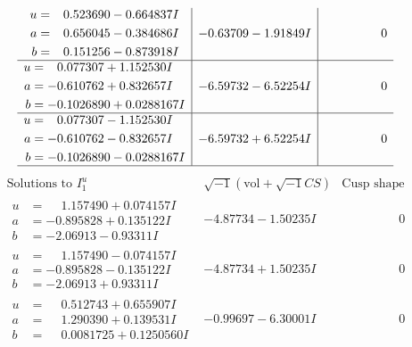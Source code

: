 \documentclass[1p]{elsarticle_modified}
\theoremstyle{definition}
\newcommand{\I}{\sqrt{-1}}
\begin{document}
$$\begin{array}{c|c|c}
\begin{aligned}
u &= \phantom{-}0.523690 - 0.664837 I \\
a &= \phantom{-}0.656045 - 0.384686 I \\
b &= \phantom{-}0.151256 - 0.873918 I\end{aligned}
 & -0.63709 - 1.91849 I & \phantom{-0.000000 } 0 \\ \hline\begin{aligned}
u &= \phantom{-}0.077307 + 1.152530 I \\
a &= -0.610762 + 0.832657 I \\
b &= -0.1026890 + 0.0288167 I\end{aligned}
 & -6.59732 - 6.52254 I & \phantom{-0.000000 } 0 \\ \hline\begin{aligned}
u &= \phantom{-}0.077307 - 1.152530 I \\
a &= -0.610762 - 0.832657 I \\
b &= -0.1026890 - 0.0288167 I\end{aligned}
 & -6.59732 + 6.52254 I & \phantom{-0.000000 } 0\\
 \hline 
 \end{array}$$\newpage$$\begin{array}{c|c|c}  
\text{Solutions to }I^u_{1}& \I (\text{vol} + \sqrt{-1}CS) & \text{Cusp shape}\\
 \hline 
\begin{aligned}
u &= \phantom{-}1.157490 + 0.074157 I \\
a &= -0.895828 + 0.135122 I \\
b &= -2.06913 - 0.93311 I\end{aligned}
 & -4.87734 - 1.50235 I & \phantom{-0.000000 } 0 \\ \hline\begin{aligned}
u &= \phantom{-}1.157490 - 0.074157 I \\
a &= -0.895828 - 0.135122 I \\
b &= -2.06913 + 0.93311 I\end{aligned}
 & -4.87734 + 1.50235 I & \phantom{-0.000000 } 0 \\ \hline\begin{aligned}
u &= \phantom{-}0.512743 + 0.655907 I \\
a &= \phantom{-}1.290390 + 0.139531 I \\
b &= \phantom{-}0.0081725 + 0.1250560 I\end{aligned}
 & -0.99697 - 6.30001 I & \phantom{-0.000000 } 0 \\ \hline\begin{aligned}

\end{aligned}
\end{array}$$
\end{document}
